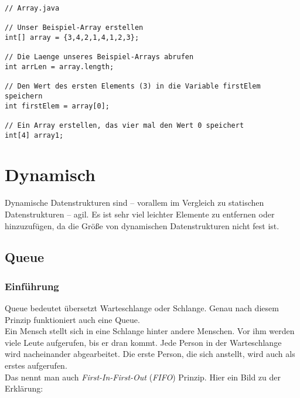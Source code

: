 \begin{center}  
\begin{lstlisting}
// Array.java

// Unser Beispiel-Array erstellen
int[] array = {3,4,2,1,4,1,2,3};

// Die Laenge unseres Beispiel-Arrays abrufen
int arrLen = array.length;

// Den Wert des ersten Elements (3) in die Variable firstElem speichern
int firstElem = array[0];

// Ein Array erstellen, das vier mal den Wert 0 speichert
int[4] array1;
\end{lstlisting}
\end{center}

\section{Dynamisch}
\begin{flushleft}   
    Dynamische Datenstrukturen sind -- vorallem im Vergleich zu statischen Datenstrukturen -- agil.
    Es ist sehr viel leichter Elemente zu entfernen oder hinzuzufügen, da die Größe von dynamischen Datenstrukturen nicht fest ist.
\end{flushleft}

\subsection{Queue}
\subsubsection{Einführung}

\begin{flushleft}   
    Queue bedeutet übersetzt Warteschlange oder Schlange.
    Genau nach diesem Prinzip funktioniert auch eine Queue. \\
    Ein Mensch stellt sich in eine Schlange hinter andere Menschen.
    Vor ihm werden viele Leute aufgerufen, bis er dran kommt.
    Jede Person in der Warteschlange wird nacheinander abgearbeitet.
    Die erste Person, die sich anstellt, wird auch als erstes aufgerufen. \\
    Das nennt man auch \textit{First-In-First-Out} (\textit{FIFO}) Prinzip.
    Hier ein Bild zu der Erklärung:
\end{flushleft}

\begin{center}
\end{center}

